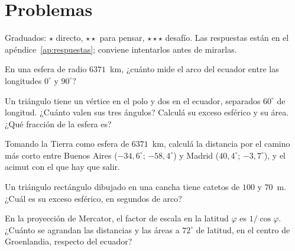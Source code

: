 \section{Problemas}\label{sec:problemas-15}

Graduados: \({\star}\) directo, \({\star}{\star}\) para pensar, \({\star}{\star}{\star}\) desafío. Las respuestas están en el apéndice~\ref{ap:respuestas}; conviene intentarlos antes de mirarlas.

\begin{problema}[\({\star}\)]\label{pb:15-1}
En una esfera de radio \(6371\)~km, ¿cuánto mide el arco del ecuador entre las longitudes \(0^\circ\) y \(90^\circ\)?
\end{problema}

\begin{problema}[\({\star}{\star}\)]\label{pb:15-2}
Un triángulo tiene un vértice en el polo y dos en el ecuador, separados \(60^\circ\) de longitud. ¿Cuánto valen sus tres ángulos? Calculá su exceso esférico y su área. ¿Qué fracción de la esfera es?
\end{problema}

\begin{problema}[\({\star}{\star}\)]\label{pb:15-3}
Tomando la Tierra como esfera de \(6371\)~km, calculá la distancia por el camino más corto entre Buenos Aires (\(-34{,}6^\circ\); \(-58{,}4^\circ\)) y Madrid (\(40{,}4^\circ\); \(-3{,}7^\circ\)), y el acimut con el que hay que salir.
\end{problema}

\begin{problema}[\({\star}{\star}\)]\label{pb:15-4}
Un triángulo rectángulo dibujado en una cancha tiene catetos de \(100\) y \(70\)~m. ¿Cuál es su exceso esférico, en segundos de arco?
\end{problema}

\begin{problema}[\({\star}{\star}{\star}\)]\label{pb:15-5}
En la proyección de Mercator, el factor de escala en la latitud \(\varphi\) es \(1/\cos\varphi\). ¿Cuánto se agrandan las distancias y las áreas a \(72^\circ\) de latitud, en el centro de Groenlandia, respecto del ecuador?
\end{problema}
